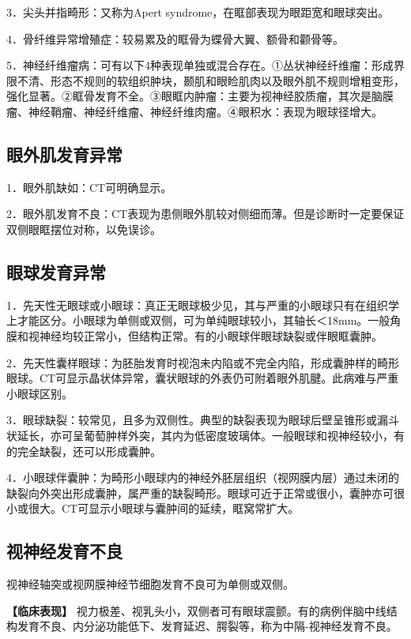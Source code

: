 3．尖头并指畸形：又称为Apert syndrome，在眶部表现为眼距宽和眼球突出。

4．骨纤维异常增殖症：较易累及的眶骨为蝶骨大翼、额骨和颧骨等。

5．神经纤维瘤病：可有以下4种表现单独或混合存在。①丛状神经纤维瘤：形成界限不清、形态不规则的软组织肿块，颞肌和眼睑肌肉以及眼外肌不规则增粗变形，强化显著。②眶骨发育不全。③眼眶内肿瘤：主要为视神经胶质瘤，其次是脑膜瘤、神经鞘瘤、神经纤维瘤、神经纤维肉瘤。④眼积水：表现为眼球径增大。

\subsection{眼外肌发育异常}

1．眼外肌缺如：CT可明确显示。

2．眼外肌发育不良：CT表现为患侧眼外肌较对侧细而薄。但是诊断时一定要保证双侧眼眶摆位对称，以免误诊。

\subsection{眼球发育异常}

1．先天性无眼球或小眼球：真正无眼球极少见，其与严重的小眼球只有在组织学上才能区分。小眼球为单侧或双侧，可为单纯眼球较小，其轴长＜18mm。一般角膜和视神经均较正常小，但结构正常。有的小眼球伴眼球缺裂或伴眼眶囊肿。

2．先天性囊样眼球：为胚胎发育时视泡未内陷或不完全内陷，形成囊肿样的畸形眼球。CT可显示晶状体异常，囊状眼球的外表仍可附着眼外肌腱。此病难与严重小眼球区别。

3．眼球缺裂：较常见，且多为双侧性。典型的缺裂表现为眼球后壁呈锥形或漏斗状延长，亦可呈葡萄肿样外突，其内为低密度玻璃体。一般眼球和视神经较小，有的完全缺裂，还可以形成囊肿。

4．小眼球伴囊肿：为畸形小眼球内的神经外胚层组织（视网膜内层）通过未闭的缺裂向外突出形成囊肿，属严重的缺裂畸形。眼球可近于正常或很小，囊肿亦可很小或很大。CT可显示小眼球与囊肿间的延续，眶窝常扩大。

\subsection{视神经发育不良}

视神经轴突或视网膜神经节细胞发育不良可为单侧或双侧。

\textbf{【临床表现】}
视力极差、视乳头小，双侧者可有眼球震颤。有的病例伴脑中线结构发育不良、内分泌功能低下、发育延迟、腭裂等，称为中隔-视神经发育不良。

